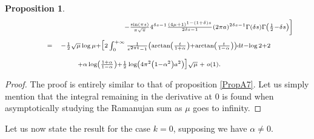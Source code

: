 \documentclass{jams-l}
\newtheorem{proposition}[theorem]{Proposition}
\theoremstyle{definition}
\theoremstyle{remark}
\numberwithin{equation}{section}
\begin{document}
\begin{proposition}
\[\begin{array}{lll}
                        \multicolumn{3}{l}{\scriptstyle \qquad \qquad \qquad \qquad \qquad \qquad \left. - \frac{\sin \left( \pi s \right)}{\pi \sqrt{\pi}} 4^{\delta s - 1} \frac{\left( 4 \mu + 1 \right)^{1 - \left( 1 + \delta \right) s}}{2 \delta s - 1} \left( 2 \pi a \right)^{2 \delta s - 1} \Gamma \left( \delta s \right) \Gamma \left( \frac{1}{2} - \delta s \right) \right]} \\[1em]
                        
                        \qquad & \scriptstyle = & \scriptstyle - \frac{1}{2} \sqrt{\mu} \log \mu + \big[ 2 \int_0^{+ \infty} \frac{1}{e^{2 \pi t} - 1} \left( \arctan \left( \frac{t}{1 + \alpha} \right) + \arctan \left( \frac{t}{1 - \alpha} \right) \right) \mathrm{d}t  - \log 2 + 2 \\[1em]
                        
                        && \scriptstyle \qquad  + \alpha \log \left( \frac{1 + \alpha}{1 - \alpha} \right) + \frac{1}{2} \log \left( 4 \pi^2 \left( 1 - \alpha^2 \right) a^2 \right) \big] \sqrt{\mu} \; + \; o \left( 1 \right).
                    \end{array} \]
            
            \end{proposition}
            
            \begin{proof}
            
                The proof is entirely similar to that of proposition \ref{PropA7}. Let us simply mention that the integral remaining in the derivative at $0$ is found when asymptotically studying the Ramanujan sum as $\mu$ goes to infinity.
            
            \end{proof}
            
            Let us now state the result for the case $k = 0$, supposing we have $\alpha \neq 0$.
            
\end{document}
